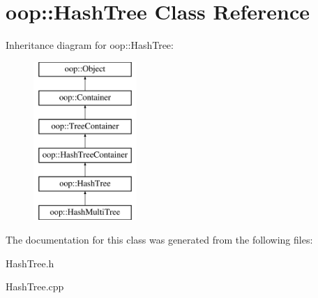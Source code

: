 \hypertarget{classoop_1_1HashTree}{\section{oop\-:\-:\-Hash\-Tree \-Class \-Reference}
\label{classoop_1_1HashTree}
}
\-Inheritance diagram for oop\-:\-:\-Hash\-Tree\-:\begin{figure}[H]
\begin{center}
\leavevmode
\includegraphics[height=6.000000cm]{classoop_1_1HashTree}
\end{center}
\end{figure}


\-The documentation for this class was generated from the following files\-:\begin{DoxyCompactItemize}
\item 
\-Hash\-Tree.\-h\item 
\-Hash\-Tree.\-cpp\end{DoxyCompactItemize}

